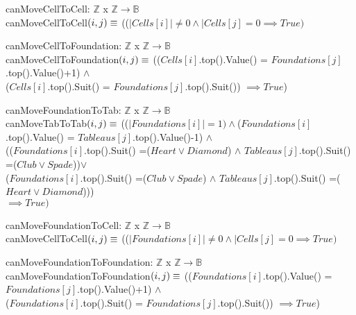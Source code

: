\documentclass[12pt]{article}
\begin{document}
\bigskip
\noindent canMoveCellToCell: $\mathbb{Z}$ x $\mathbb{Z}$$\rightarrow \mathbb{B}$\\
canMoveCellToCell$(i, j)\\
\equiv$ (($|Cells[i]| \neq 0 \land |Cells[j] = 0 \implies True)$

\bigskip
\noindent canMoveCellToFoundation: $\mathbb{Z}$ x $\mathbb{Z}$$\rightarrow \mathbb{B}$\\
canMoveCellToFoundation$(i, j)\\
\equiv$ (($Cells[i]$.top().Value() = $Foundations[j]$.top().Value()+1) $\land$\\
($Cells[i]$.top().Suit() = $Foundations[j]$.top().Suit()) $\implies True$)

\bigskip
\noindent canMoveFoundationToTab: $\mathbb{Z}$ x $\mathbb{Z}$$\rightarrow \mathbb{B}$\\
canMoveTabToTab$(i, j)\\
\equiv$ (($|Foundations[i]| = 1) \land $($Foundations[i]$.top().Value() = $Tableaus[j]$.top().Value()-1) $\land$\\
(($Foundations[i]$.top().Suit() =($Heart \lor Diamond$) $\land$ $Tableaus[j]$.top().Suit() =($Club \lor Spade$))$\lor$\\
($Foundations[i]$.top().Suit() =($Club \lor Spade$) $\land$ $Tableaus[j]$.top().Suit() =($Heart \lor Diamond$)))\\
$\implies True)$

\bigskip
\noindent canMoveFoundationToCell: $\mathbb{Z}$ x $\mathbb{Z}$$\rightarrow \mathbb{B}$\\
canMoveCellToCell$(i, j)\\
\equiv$ (($|Foundations[i]| \neq 0 \land |Cells[j] = 0 \implies True)$

\bigskip
\noindent canMoveFoundationToFoundation: $\mathbb{Z}$ x $\mathbb{Z}$$\rightarrow \mathbb{B}$\\
canMoveFoundationToFoundation$(i, j)\\
\equiv$ (($Foundations[i]$.top().Value() = $Foundations[j]$.top().Value()+1) $\land$\\
($Foundations[i]$.top().Suit() = $Foundations[j]$.top().Suit()) $\implies True$)
\end{document}
